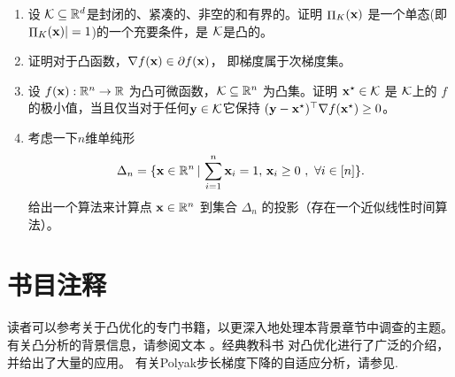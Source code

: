 \begin{enumerate}
\begin{enumerate}
\end{enumerate}



\item
设 $\mathcal K\subseteq{\mathbb R}^d$是封闭的、紧凑的、非空的和有界的。证明 $\mathop{\Pi}_K(\mathbf x)$ 是一个单态(即 $\mathop{\Pi}_K(\mathbf x)|=1$)的一个充要条件，是 $\mathcal K$是凸的。


\item
证明对于凸函数，$\nabla f(\mathbf x)\in\partial f(\mathbf x)$， 即梯度属于次梯度集。

\item
 设 $f(\mathbf x): \mathbb{R}^n\rightarrow\mathbb{R}$ 为凸可微函数，$\mathcal K\subseteq\mathbb{R}^n$ 为凸集。证明 $\mathbf x^\star\in\mathcal K$ 是 $\mathcal K$上的 $f$的极小值，当且仅当对于任何$\mathbf y\in\mathcal K$它保持 $(\mathbf y-\mathbf x^\star)^{\top}\nabla f(\mathbf x^\star)\geq 0$。

\item
考虑一下$n$维单纯形
$$\Delta_n = \lbrace{\ensuremath{\mathbf x}\in\mathbb{R}^n \, | \, \sum_{i=1}^n \ensuremath{\mathbf x}_i = 1, \, \ensuremath{\mathbf x}_i \geq 0 \ ,  \ \forall{i\in[n]}}\rbrace .$$
给出一个算法来计算点 $\mathbf x\in\mathbb{R}^n$ 到集合 $\Delta_n$ 的投影（存在一个近似线性时间算法）。

\end{enumerate}





\newpage
\section{
书目注释
}


读者可以参考关于凸优化的专门书籍，以更深入地处理本背景章节中调查的主题。有关凸分析的背景信息，请参阅文本 \cite{borwein2006convex,rockafellar1997convex}。经典教科书 \cite{boyd.convex}对凸优化进行了广泛的介绍，并给出了大量的应用。
有关Polyak步长梯度下降的自适应分析，请参见\cite{hazan2019revisiting}.